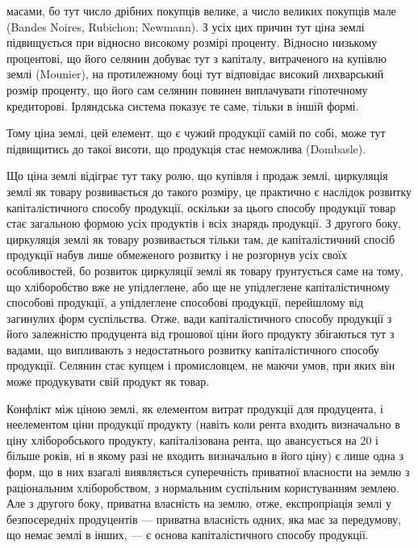 \parcont{}  %
масами, бо тут число дрібних покупців велике, а число великих покупців мале
(Bandes Noires, Rubichon; Newmann). З усіх цих причин тут ціна землі підвищується
при відносно високому розмірі проценту. Відносно низькому процентові,
що його селянин добуває тут з капіталу, витраченого на купівлю землі (Mounier),
на протилежному боці тут відповідає високий лихварський розмір проценту,
що його сам селянин повинен виплачувати гіпотечному кредиторові. Ірляндська
система показує те саме, тільки в іншій формі.

Тому ціна землі, цей елемент, що є чужий продукції самій по собі, може
тут підвищитись до такої висоти, що продукція стає неможлива (Dombasle).

Що ціна землі відіграє тут таку ролю, що купівля і продаж землі, циркуляція
землі як товару розвивається до такого розміру, це практично є наслідок
розвитку капіталістичного способу продукції, оскільки за цього способу продукції
товар стає загальною формою усіх продуктів і всіх знарядь продукції. З другого
боку, циркуляція землі як товару розвивається тільки там, де капіталістичний
спосіб продукції набув лише обмеженого розвитку і не розгорнув усіх своїх
особливостей, бо розвиток циркуляції землі як товару ґрунтується саме на тому,
що хліборобство вже не упідлеглене, або ще не упідлеглене капіталістичному
способові продукції, а упідлеглене способові продукції, перейшлому від загинулих
форм суспільства. Отже, вади капіталістичного способу продукції з його
залежністю продуцента від грошової ціни його продукту збігаються тут з вадами,
що випливають з недостатнього розвитку капіталістичного способу продукції.
Селянин стає купцем і промисловцем, не маючи умов, при яких він може продукувати
свій продукт як товар.

Конфлікт між ціною землі, як елементом витрат продукції для продуцента,
і неелементом ціни продукції продукту (навіть коли рента входить визначально
в ціну хліборобського продукту, капіталізована рента, що авансується на 20
і більше років, ні в якому разі не входить визначально в його ціну) є лише
одна з форм, що в них взагалі виявляється суперечність приватної власности на
землю з раціональним хліборобством, з нормальним суспільним користуванням
землею. Але з другого боку, приватна власність на землю, отже, експропріація
землі у безпосередніх продуцентів — приватна власність одних, яка має
за передумову, що немає землі в інших, — є основа капіталістичного способу
продукції.

